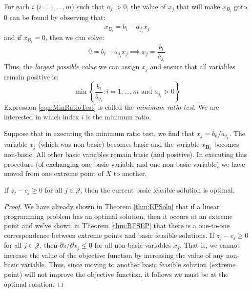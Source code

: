 For each $i$ ($i=1,\dots,m$) such that $\overline{a}_{j_i} > 0$, the value of $x_j$ that will make $x_{B_i}$ goto $0$ can be found by observing that:
\begin{equation}
x_{B_i} = \overline{b}_i - \overline{a}_{j_i}x_j
\end{equation}
and if $x_{B_i} = 0$, then we can solve:
\begin{equation}
0 = \overline{b}_i - \overline{a}_{j_i}x_j \implies
x_j = \frac{\overline{b}_i}{\overline{a}_{j_i}}
\end{equation}
Thus, the \textit{largest possible value} we can assign $x_j$ and ensure that all variables remain positive is:
\begin{equation}
\min\left\{ \frac{\overline{b}_i}{\overline{a}_{j_i}} : i=1,\dots,m \text{ and } a_{j_i} > 0 \right\}
\label{eqn:MinRatioTest}
\end{equation}
Expression \ref{eqn:MinRatioTest} is called the \textit{minimum ratio test}. We are interested in which index $i$ is the minimum ratio.

Suppose that in executing the minimum ratio test, we find that $x_j = \overline{b}_k / \overline{a}_{j_k}$. The variable $x_j$ (which was non-basic) becomes basic and the variable $x_{\mathbf{B}_k}$ becomes non-basic. All other basic variables remain basic (and positive). In executing this procedure (of exchanging one basic variable and one non-basic variable) we have moved from one extreme point of $X$ to another. 

\begin{theorem} If $z_j - c_j \geq 0$ for all $j \in \mathcal{J}$, then the current basic feasible solution is optimal.
\label{thm:SimplixOptimality}
\end{theorem}
\begin{proof} We have already shown in Theorem \ref{thm:EPSoln} that if a linear programming problem has an optimal solution, then it occurs at an extreme point and we've shown in Theorem \ref{thm:BFSEP} that there is a one-to-one correspondence between extreme points and basic feasible solutions. If $z_j - c_j \geq 0$ for all $j \in \mathcal{J}$, then $\partial z/\partial x_j \leq 0$ for all non-basic variables $x_j$. That is, we cannot increase the value of the objective function by increasing the value of any non-basic variable. Thus, since moving to another basic feasible solution (extreme point) will not improve the objective function, it follows we must be at the optimal solution.
\end{proof}


